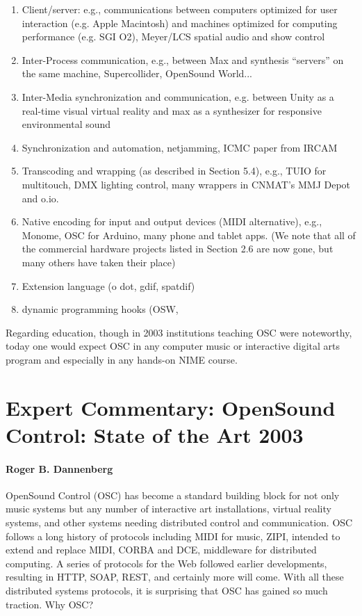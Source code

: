 \begin{enumerate}
	\item Client/server: e.g., communications between computers optimized for user interaction (e.g. Apple Macintosh) and machines optimized for computing performance (e.g. SGI O2), Meyer/LCS spatial audio and show control
	\item Inter-Process communication, e.g., between Max and synthesis ``servers'' on the same machine, Supercollider, OpenSound World...
	\item Inter-Media synchronization and communication, e.g. between Unity as a real-time visual virtual reality and max as a synthesizer for responsive environmental sound
	\item Synchronization and automation, netjamming, ICMC paper from IRCAM
	\item Transcoding and wrapping (as described in Section 5.4), e.g., TUIO for multitouch, DMX lighting control, many wrappers in CNMAT's MMJ Depot and o.io.
	\item Native encoding for input and output devices (MIDI alternative), e.g., Monome, OSC for Arduino, many phone and tablet apps.  (We note that all of the commercial hardware projects listed in Section 2.6 are now gone, but many others have taken their place)
	\item Extension language (o dot, gdif, spatdif)
	\item dynamic programming hooks (OSW, 
\end{enumerate}
 
Regarding education, though in 2003 institutions teaching OSC were noteworthy, today one would expect OSC in any computer music or interactive digital arts program and especially in any hands-on NIME course.


\section*{Expert Commentary: OpenSound Control: State of the Art 2003}


\paragraph{Roger B. Dannenberg}


OpenSound Control (OSC) has become a standard building block for not only music systems but any number of interactive art installations, virtual reality systems, and other systems needing distributed control and communication. OSC follows a long history of protocols including MIDI for music, ZIPI, intended to extend and replace MIDI, CORBA and DCE, middleware for distributed computing. A series of protocols for the Web followed earlier developments, resulting in HTTP, SOAP, REST, and certainly more will come. With all these distributed systems protocols, it is surprising that OSC has gained so much traction. Why OSC?

